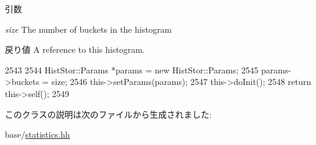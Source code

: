\begin{DoxyParams}{引数}
\item[{\em size}]The number of buckets in the histogram \end{DoxyParams}
\begin{DoxyReturn}{戻り値}
A reference to this histogram. 
\end{DoxyReturn}



\begin{DoxyCode}
2543     {
2544         HistStor::Params *params = new HistStor::Params;
2545         params->buckets = size;
2546         this->setParams(params);
2547         this->doInit();
2548         return this->self();
2549     }
\end{DoxyCode}


このクラスの説明は次のファイルから生成されました:\begin{DoxyCompactItemize}
\item 
base/\hyperlink{statistics_8hh}{statistics.hh}\end{DoxyCompactItemize}
